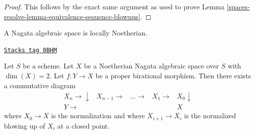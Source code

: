 \begin{proof}
This follows by the exact same argument as used to prove
Lemma \ref{spaces-resolve-lemma-equivalence-sequence-blowups}.
\end{proof}

A Nagata algebraic space is locally Noetherian.

\begin{lemma}
\label{spaces-resolve-lemma-dominate-by-normalized-blowing-up}
\href{https://stacks.math.columbia.edu/tag/0BHM}{\texttt{Stacks tag 0BHM}}

Let $S$ be a scheme. Let $X$ be a Noetherian Nagata algebraic space over $S$
with $\dim(X) = 2$. Let $f : Y \to X$ be a proper birational morphism.
Then there exists a commutative diagram
$$
\begin{array}{ccccc}X_n \longrightarrow\downarrow & X_{n - 1} \longrightarrow & \ldots \longrightarrow & X_1 \longrightarrow & X_0 \downarrow \\ Y \longrightarrow &  &  &  & X\end{array}
$$
where $X_0 \to X$ is the normalization and
where $X_{i + 1} \to X_i$ is the normalized blowing up of $X_i$ at a closed
point.
\end{lemma}

